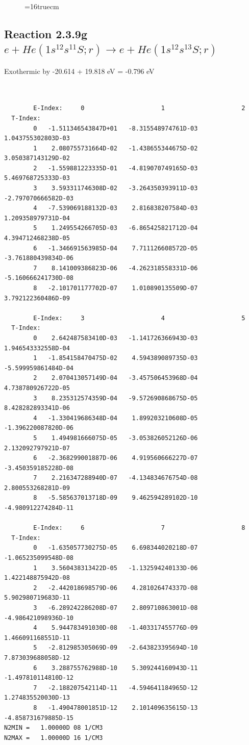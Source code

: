 \documentclass[12pt,dvipdfmx]{article}
\begin{document}
\begin{figure} \label{2.3.9f}
\epsfxsize=16truecm
\end{figure}
\newpage

\subsection{
Reaction 2.3.9g $ e + He(1s^12s^11S;r) \rightarrow e + He(1s^12s^13S;r) $
}
Exothermic by -20.614 + 19.818 eV = -0.796 eV



\begin{small}\begin{verbatim}


        E-Index:     0                     1                     2
  T-Index:
        0   -1.511346543847D+01   -8.315548974761D-03    1.043755302803D-03
        1    2.080755731664D-02   -1.438655344675D-02    3.050387143129D-02
        2   -1.559881223335D-01   -4.819070749165D-03    5.469768725333D-03
        3    3.593311746308D-02   -3.264350393911D-03   -2.797070666582D-03
        4   -7.539069188132D-03    2.816838207584D-03    1.209358979731D-04
        5    1.249554266705D-03   -6.865425821712D-04    4.394712468238D-05
        6   -1.346691563985D-04    7.711126608572D-05   -3.761880439834D-06
        7    8.141009386823D-06   -4.262318558331D-06   -5.160666241730D-08
        8   -2.101701177702D-07    1.010890135509D-07    3.792122360486D-09

        E-Index:     3                     4                     5
  T-Index:
        0    2.642487583410D-03   -1.141726366943D-03    1.946543332558D-04
        1   -1.854158470475D-02    4.594389089735D-03   -5.599959861484D-04
        2    2.070413057149D-04   -3.457506453968D-04    4.738780926722D-05
        3    8.235312574359D-04   -9.572690868675D-05    8.428282893341D-06
        4   -1.330419686348D-04    1.899203210608D-05   -1.396220087820D-06
        5    1.494981666075D-05   -3.053826052126D-06    2.132092797921D-07
        6   -2.368299001887D-06    4.919560666227D-07   -3.450359185228D-08
        7    2.216347288940D-07   -4.134834676754D-08    2.800553268281D-09
        8   -5.585637013718D-09    9.462594289102D-10   -4.980912274284D-11

        E-Index:     6                     7                     8
  T-Index:
        0   -1.635057730275D-05    6.698344020218D-07   -1.065235099548D-08
        1    3.560438313422D-05   -1.132594240133D-06    1.422148875942D-08
        2   -2.442018698579D-06    4.281026474337D-08    5.902980719683D-11
        3   -6.289242286208D-07    2.809710863001D-08   -4.986421098936D-10
        4    5.944783491030D-08   -1.403317455776D-09    1.466091168551D-11
        5   -2.812985305069D-09   -2.643823395694D-10    7.873039688058D-12
        6    3.288755762988D-10    5.309244160943D-11   -1.497810114810D-12
        7   -2.188207542114D-11   -4.594641184965D-12    1.274835520030D-13
        8   -1.490478001851D-12    2.101409635615D-13   -4.858731679885D-15
N2MIN =   1.00000D 08 1/CM3
N2MAX =   1.00000D 16 1/CM3


\end{verbatim}
\end{small}
\end{document}
